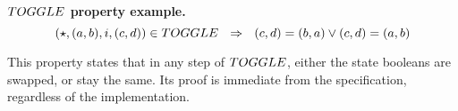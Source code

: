 %
%
%

%
%

%
%
%

%
%

%
%

%


\textbf{$\TOGGLE$ property example. }
\[ (\emptytype, (a,b), i, (c, d)) \in \TOGGLE ~~\Rightarrow~~
(c, d) = (b, a) \vee (c, d) = (a, b) \]

This property states that in any step of $\TOGGLE$, either the state booleans are swapped,
or stay the same. Its proof is immediate from the specification, regardless of the
implementation.
%
%
